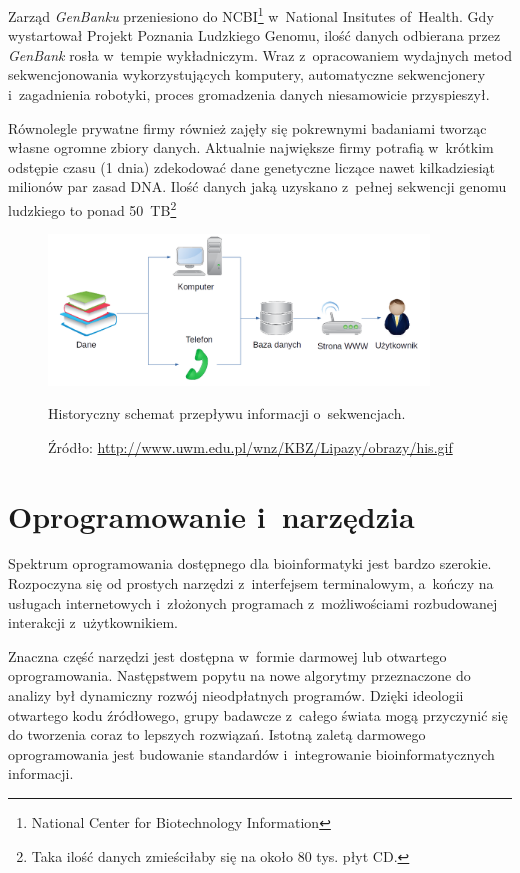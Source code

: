 \documentclass[a4paper,12pt,oneside]{mwrep}  %
\begin{document}
Zarząd \emph{GenBanku} przeniesiono do NCBI\footnote{National Center for Biotechnology Information} w~National Insitutes of~Health. Gdy wystartował Projekt Poznania Ludzkiego Genomu, ilość danych odbierana przez \emph{GenBank} rosła w~tempie wykładniczym. Wraz z~opracowaniem wydajnych metod sekwencjonowania wykorzystujących komputery, automatyczne sekwencjonery i~zagadnienia robotyki, proces gromadzenia danych niesamowicie przyspieszył. %

Równolegle prywatne firmy również zajęły się pokrewnymi badaniami tworząc własne ogromne zbiory danych. Aktualnie największe firmy potrafią w~krótkim odstępie czasu (1 dnia) zdekodować dane genetyczne liczące nawet kilkadziesiąt milionów par zasad DNA. Ilość danych jaką uzyskano z~pełnej sekwencji genomu ludzkiego to ponad 50~TB\footnote{Taka ilość danych zmieściłaby się na około 80 tys. płyt CD.} %
\begin{figure}[h]
\centering
\includegraphics[width=0.9\textwidth]{grafika/historia.png}
\caption{Historyczny schemat przepływu informacji o~sekwencjach.}
\vspace{-0.8cm}
\caption*{\scriptsize Źródło: \url{http://www.uwm.edu.pl/wnz/KBZ/Lipazy/obrazy/his.gif}}
\label{historia-przeplywu-danych-sekwencji}
\end{figure}

\section{Oprogramowanie i~narzędzia}
Spektrum oprogramowania dostępnego dla bioinformatyki jest bardzo szerokie. Rozpoczyna się od prostych narzędzi z~interfejsem terminalowym, a~kończy na usługach internetowych i~złożonych programach z~możliwościami rozbudowanej interakcji z~użytkownikiem. %

Znaczna część narzędzi jest dostępna w~formie darmowej lub otwartego oprogramowania. Następstwem popytu na nowe algorytmy przeznaczone do analizy był dynamiczny rozwój nieodpłatnych programów. Dzięki ideologii otwartego kodu źródłowego, grupy badawcze z~całego świata mogą przyczynić się do tworzenia coraz to lepszych rozwiązań. Istotną zaletą darmowego oprogramowania jest budowanie standardów i~integrowanie bioinformatycznych informacji. %
\end{document}
